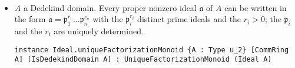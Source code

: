 \begin{thm}
~\begin{itemize}
    \item[] $A$ a Dedekind domain. Every proper nonzero ideal $\mathfrak{a}$ of $A$ can be written in the form
    $\mathfrak{a}=\mathfrak{p}_1^{r_1} \dots \mathfrak{p}_n^{r_n}$
    with the $\mathfrak{p}_i^{r_i}$ distinct prime ideals and the $r_i > 0$; the $\mathfrak{p}_i$ and the $r_i$ are uniquely determined.
    \begin{listing}[!htpb]
    \begin{verbatim}
instance Ideal.uniqueFactorizationMonoid {A : Type u_2} [CommRing A] [IsDedekindDomain A] : UniqueFactorizationMonoid (Ideal A)
    \end{verbatim}
    \end{listing}
\end{itemize}


\end{thm}